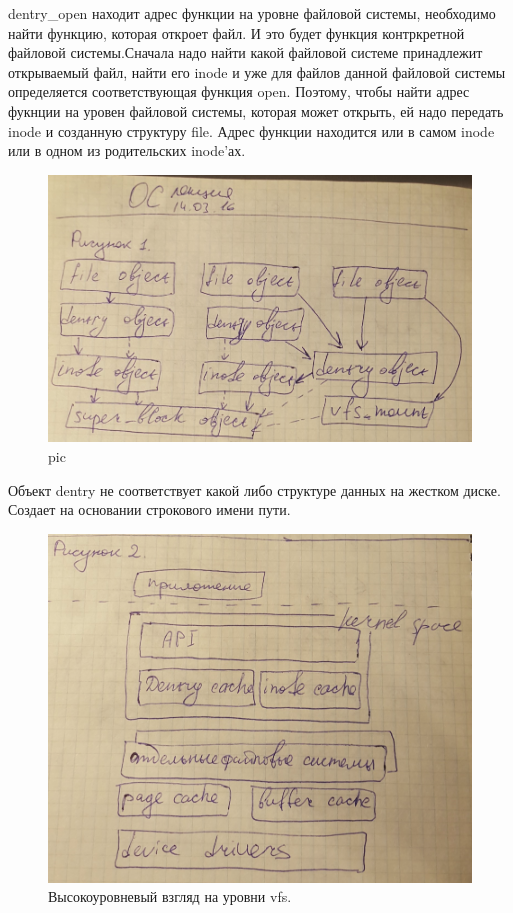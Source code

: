  

dentry\_open находит адрес функции на уровне файловой системы, необходимо найти функцию, которая откроет файл. И это будет функция контркретной файловой системы.Сначала надо найти какой файловой системе принадлежит открываемый файл, найти его inode и  уже для файлов данной файловой системы определяется соответствующая функция open. Поэтому, чтобы найти адрес фукнции на уровен файловой системы, которая может открыть, ей надо передать inode и созданную структуру file. 
Адрес функции находится или в самом inode или в одном из родительских inode'ах.

\begin{figure}[H]
  \centering
  \includegraphics[width=\textwidth]{pic/1.png}
  \caption{pic}
\end{figure}

 

Объект dentry не соответствует какой либо структуре данных на жестком диске. Создает на основании строкового имени пути.

\begin{figure}[H]
  \centering
  \includegraphics[width=\textwidth]{pic/2.png}
  \caption{Высокоуровневый взгляд на уровни vfs.}
\end{figure}

